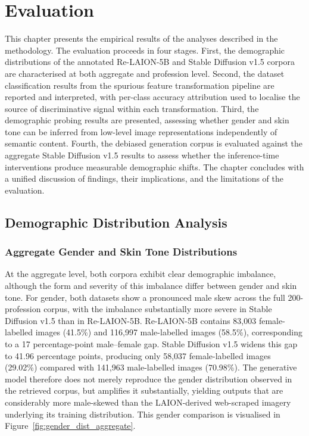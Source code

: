 \graphicspath{{content/chapters/4_evaluation/figures/}}

\chapter{Evaluation}
\label{chp:evaluation}

This chapter presents the empirical results of the analyses described in the methodology. The evaluation proceeds in four stages. First, the demographic distributions of the annotated Re-LAION-5B and Stable Diffusion v1.5 corpora are characterised at both aggregate and profession level. Second, the dataset classification results from the spurious feature transformation pipeline are reported and interpreted, with per-class accuracy attribution used to localise the source of discriminative signal within each transformation. Third, the demographic probing results are presented, assessing whether gender and skin tone can be inferred from low-level image representations independently of semantic content. Fourth, the debiased generation corpus is evaluated against the aggregate Stable Diffusion v1.5 results to assess whether the inference-time interventions produce measurable demographic shifts. The chapter concludes with a unified discussion of findings, their implications, and the limitations of the evaluation.

\section{Demographic Distribution Analysis}
\label{sec:demographic_distributions}

\subsection{Aggregate Gender and Skin Tone Distributions}

At the aggregate level, both corpora exhibit clear demographic imbalance, although the form and severity of this imbalance differ between gender and skin tone. For gender, both datasets show a pronounced male skew across the full 200-profession corpus, with the imbalance substantially more severe in Stable Diffusion v1.5 than in Re-LAION-5B. Re-LAION-5B contains 83,003 female-labelled images (41.5\%) and 116,997 male-labelled images (58.5\%), corresponding to a 17 percentage-point male--female gap. Stable Diffusion v1.5 widens this gap to 41.96 percentage points, producing only 58,037 female-labelled images (29.02\%) compared with 141,963 male-labelled images (70.98\%). The generative model therefore does not merely reproduce the gender distribution observed in the retrieved corpus, but amplifies it substantially, yielding outputs that are considerably more male-skewed than the LAION-derived web-scraped imagery underlying its training distribution. This gender comparison is visualised in Figure~\ref{fig:gender_dist_aggregate}.

